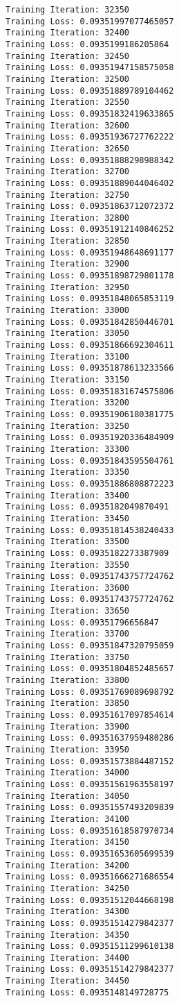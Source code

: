 \documentclass[11pt]{article}
\begin{document}
\begin{Verbatim}[commandchars=\\\{\}]
Training Iteration: 32350
Training Loss: 0.09351997077465057
Training Iteration: 32400
Training Loss: 0.0935199186205864
Training Iteration: 32450
Training Loss: 0.09351947158575058
Training Iteration: 32500
Training Loss: 0.09351889789104462
Training Iteration: 32550
Training Loss: 0.09351832419633865
Training Iteration: 32600
Training Loss: 0.09351936727762222
Training Iteration: 32650
Training Loss: 0.09351888298988342
Training Iteration: 32700
Training Loss: 0.09351889044046402
Training Iteration: 32750
Training Loss: 0.09351863712072372
Training Iteration: 32800
Training Loss: 0.09351912140846252
Training Iteration: 32850
Training Loss: 0.09351948648691177
Training Iteration: 32900
Training Loss: 0.09351898729801178
Training Iteration: 32950
Training Loss: 0.09351848065853119
Training Iteration: 33000
Training Loss: 0.09351842850446701
Training Iteration: 33050
Training Loss: 0.09351866692304611
Training Iteration: 33100
Training Loss: 0.09351878613233566
Training Iteration: 33150
Training Loss: 0.09351831674575806
Training Iteration: 33200
Training Loss: 0.09351906180381775
Training Iteration: 33250
Training Loss: 0.09351920336484909
Training Iteration: 33300
Training Loss: 0.09351843595504761
Training Iteration: 33350
Training Loss: 0.09351886808872223
Training Iteration: 33400
Training Loss: 0.0935182049870491
Training Iteration: 33450
Training Loss: 0.09351814538240433
Training Iteration: 33500
Training Loss: 0.0935182273387909
Training Iteration: 33550
Training Loss: 0.09351743757724762
Training Iteration: 33600
Training Loss: 0.09351743757724762
Training Iteration: 33650
Training Loss: 0.09351796656847
Training Iteration: 33700
Training Loss: 0.09351847320795059
Training Iteration: 33750
Training Loss: 0.09351804852485657
Training Iteration: 33800
Training Loss: 0.09351769089698792
Training Iteration: 33850
Training Loss: 0.09351617097854614
Training Iteration: 33900
Training Loss: 0.09351637959480286
Training Iteration: 33950
Training Loss: 0.09351573884487152
Training Iteration: 34000
Training Loss: 0.09351561963558197
Training Iteration: 34050
Training Loss: 0.09351557493209839
Training Iteration: 34100
Training Loss: 0.09351618587970734
Training Iteration: 34150
Training Loss: 0.09351653605699539
Training Iteration: 34200
Training Loss: 0.09351666271686554
Training Iteration: 34250
Training Loss: 0.09351512044668198
Training Iteration: 34300
Training Loss: 0.09351514279842377
Training Iteration: 34350
Training Loss: 0.09351511299610138
Training Iteration: 34400
Training Loss: 0.09351514279842377
Training Iteration: 34450
Training Loss: 0.0935148149728775

\end{Verbatim}
\end{document}
